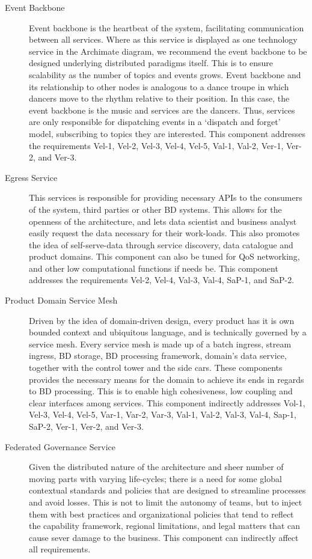 \documentclass[a4paper,11pt]{article}
\begin{document}
\begin{description}
    \item[Event Backbone] Event backbone is the heartbeat of the system, facilitating communication between all services. Where as this service is displayed as one technology service in the Archimate diagram, we recommend the event backbone to be designed underlying distributed paradigms itself. This is to ensure scalability as the number of topics and events grows. Event backbone and its relationship to other nodes is analogous to a dance troupe in which dancers move to the rhythm relative to their position. In this case, the event backbone is the music and services are the dancers. Thus, services are only responsible for dispatching events in a `dispatch and forget' model, subscribing to topics they are interested. This component addresses the requirements Vel-1, Vel-2, Vel-3, Vel-4, Vel-5, Val-1, Val-2, Ver-1, Ver-2, and Ver-3.
    
    \item[Egress Service] This services is responsible for providing necessary APIs to the consumers of the system, third parties or other BD systems. This allows for the openness of the architecture, and lets data scientist and business analyst easily request the data necessary for their work-loads. This also promotes the idea of self-serve-data through service discovery, data catalogue and product domains. This component can also be tuned for QoS networking, and other low computational functions if needs be. This component addresses the requirements Vel-2, Vel-4, Val-3, Val-4, SaP-1, and SaP-2. 
    
    \item[Product Domain Service Mesh] Driven by the idea of domain-driven design, every product has it is own bounded context and ubiquitous language, and is technically governed by a service mesh. Every service mesh is made up of a batch ingress, stream ingress, BD storage, BD processing framework, domain's data service, together with the control tower and the side cars. These components provides the necessary means for the domain to achieve its ends in regards to BD processing. This is to enable high cohesiveness, low coupling and clear interfaces among services. This component indirectly addresses Vol-1, Vel-3, Vel-4, Vel-5, Var-1, Var-2, Var-3, Val-1, Val-2, Val-3, Val-4, Sap-1, SaP-2, Ver-1, Ver-2, and Ver-3.
    
    \item[Federated Governance Service] Given the distributed nature of the architecture and sheer number of moving parts with varying life-cycles; there is a need for some global contextual standards and policies that are designed to streamline processes and avoid losses. This is not to limit the autonomy of teams, but to inject them with best practices and organizational policies that tend to reflect the capability framework, regional limitations, and legal matters that can cause sever damage to the business. This component can indirectly affect all requirements.
    

\end{description}
\end{document}

